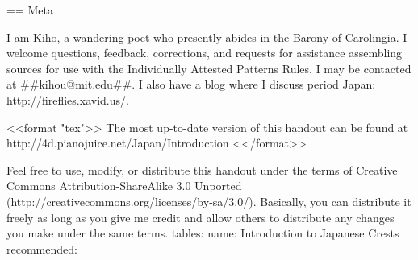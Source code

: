   == Meta

  I am Kih\=o, a wandering poet who presently abides in the Barony of
  Carolingia.  I welcome questions, feedback, corrections, and requests for
  assistance assembling sources for use with the Individually Attested
  Patterns Rules.  I may be contacted
  at ##kihou@mit.edu##.  I also have a blog where I discuss
  period Japan: http://fireflies.xavid.us/.

  <<format "tex">>
  The most up-to-date version of this handout can be found at\\
  http://4d.pianojuice.net/Japan/Introduction%
  <</format>>

  Feel free to use, modify, or distribute this handout under the terms
  of Creative Commons Attribution-ShareAlike 3.0 Unported
  (http://creativecommons.org/licenses/by-sa/3.0/).  Basically, you
  can distribute it freely as long as you give me credit and allow
  others to distribute any changes you make under the same terms.
tables:
name: Introduction to Japanese Crests
recommended:
